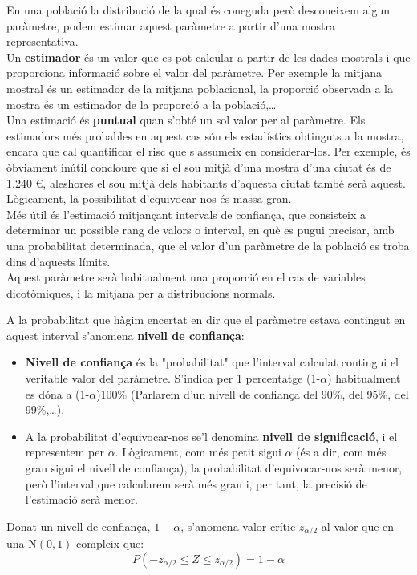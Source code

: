 \documentclass[12pt]{article}
\begin{document}
\begin{concept} \noindent
En una població la distribució de la qual és coneguda però desconeixem algun paràmetre, podem estimar aquest paràmetre a partir d'una mostra representativa. \\

Un \textbf{estimador} és un valor que es pot calcular a partir de les dades mostrals i que proporciona informació sobre el valor del paràmetre. Per exemple la mitjana mostral és un estimador de la mitjana poblacional, la proporció observada a la mostra és un estimador de la proporció a la població,… \\

Una estimació és \textbf{puntual} quan s'obté un sol valor per al paràmetre. Els estimadors més probables en aquest cas són els estadístics obtinguts a la mostra, encara que cal quantificar el risc que s'assumeix en considerar-los. Per exemple, és òbviament inútil concloure que si el sou mitjà d'una mostra d'una ciutat és de 1.240 €, aleshores el sou mitjà dels habitants d'aquesta ciutat també serà aquest. Lògicament, la possibilitat d'equivocar-nos és massa gran. \\

Més útil és l'estimació mitjançant intervals de confiança, que consisteix a determinar un possible rang de valors o interval, en què es pugui precisar, amb una probabilitat determinada, que el valor d'un paràmetre de la població es troba dins d'aquests límits. \\

Aquest paràmetre serà habitualment una proporció en el cas de variables dicotòmiques, i la mitjana per a distribucions normals.
    
\end{concept}

\begin{concept}[title=Nivell de confiança] \noindent
A la probabilitat que hàgim encertat en dir que el paràmetre estava contingut en aquest interval s'anomena \textbf{nivell de confiança}: 


\begin{itemize}
    \item \textbf{Nivell de confiança} és la "probabilitat" que l'interval calculat contingui el veritable valor del paràmetre. S'indica per 1 percentatge (1-$\alpha$) habitualment es dóna a (1-$\alpha$)100\% (Parlarem d'un nivell de confiança del 90\%, del 95\%, del 99\%,…).
    
    \item A la probabilitat d'equivocar-nos se'l denomina \textbf{nivell de significació}, i el representem per $\alpha$. Lògicament, com més petit sigui $\alpha$ (és a dir, com més gran sigui el nivell de confiança), la probabilitat d'equivocar-nos serà menor, però l'interval que calcularem serà més gran i, per tant, la precisió de l'estimació serà menor.
\end{itemize}
Donat un nivell de confiança, $1-\alpha$, s'anomena valor crític $z_{\alpha / 2}$ al valor que en una $\mathrm{N}(0,1)$ compleix que: 
$$P\left(-z_{\alpha / 2} \leq Z \leq z_{\alpha / 2}\right)=1-\alpha$$  
\end{concept}
\end{document}
